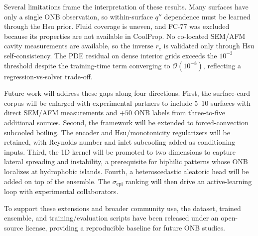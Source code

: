 Several limitations frame the interpretation of these results. Many
surfaces have only a single ONB observation, so within-surface $q''$
dependence must be learned through the Hsu prior. Fluid coverage is
uneven, and FC-77 was excluded because its properties are not available
in CoolProp. No co-located SEM/AFM cavity measurements are available,
so the inverse $r_c$ is validated only through Hsu self-consistency.
The PDE residual on dense interior grids exceeds the $10^{-3}$ threshold
despite the training-time term converging to $\mathcal{O}(10^{-8})$,
reflecting a regression-vs-solver trade-off.

Future work will address these gaps along four directions. First, the
surface-card corpus will be enlarged with experimental partners to
include \numrange{5}{10} surfaces with direct SEM/AFM measurements and
$+50$ ONB labels from three-to-five additional sources. Second, the
framework will be extended to forced-convection subcooled boiling. The
encoder and Hsu/monotonicity regularizers will be retained, with
Reynolds number and inlet subcooling added as conditioning inputs.
Third, the 1D kernel will be promoted to two dimensions to capture
lateral spreading and instability, a prerequisite for biphilic patterns
whose ONB localizes at hydrophobic islands. Fourth, a heteroscedastic
aleatoric head will be added on top of the ensemble. The
$\sigma_{\mathrm{epi}}$ ranking will then drive an active-learning loop
with experimental collaborators.

To support these extensions and broader community use, the dataset,
trained ensemble, and training/evaluation scripts have been released
under an open-source license, providing a reproducible baseline for
future ONB studies.
